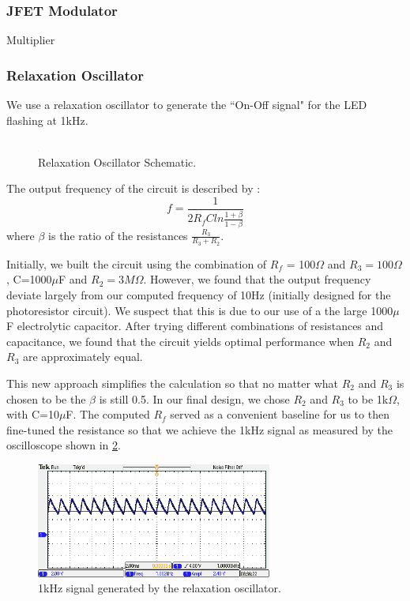 \documentclass[twocolumn]{article}
\begin{document}
\subsubsection{JFET Modulator}
Multiplier
\subsubsection{Relaxation Oscillator}
We use a relaxation oscillator to generate the ``On-Off signal" for the LED flashing at 1kHz.
\begin{figure}[h!]
 \centering
 \includegraphics[width=0.2220pt]{figure/relax_osc.png}
\caption{Relaxation Oscillator Schematic.}
\label{relax_osc}
\end{figure}
The output frequency of the circuit is described by :
\begin{equation}
f=\frac{1}{2 R_f C ln\frac{1+\beta}{1-\beta}}
\end{equation}
where $\beta$ is the ratio of the resistances $\frac{R_3}{R_3+R_2}$.
\par Initially, we built the circuit using the combination of $R_f$ = 100$\Omega$ and $R_3 = 100\Omega$, C=1000$\mu$F and $R_2 = 3 M\Omega$. However, we found that the output frequency deviate largely from our computed frequency of 10Hz (initially designed for the photoresistor circuit). We suspect that this is due to our use of a the large 1000$\mu$F electrolytic capacitor. After trying different combinations of resistances and capacitance, we found that the circuit yields optimal performance when $R_2$ and $R_3$ are approximately equal. %
\par This new approach simplifies the calculation so that no matter what $R_2$ and $R_3$ is chosen to be the $\beta$ is still 0.5. In our final design, we chose $R_2$ and $R_3$ to be 1k$\Omega$, with C=10$\mu$F. The computed $R_f$ served as a convenient baseline for us to then fine-tuned the resistance so that we achieve the 1kHz signal as measured by the oscilloscope shown in \ref{relax_osc_b4boost}.
\begin{figure}[h!]
 \centering
 \includegraphics[width=220pt]{figure/relax_osc_beforeboost.png}
\caption{1kHz signal generated by the relaxation oscillator.}
\label{relax_osc_b4boost}
\end{figure}
\end{document}
